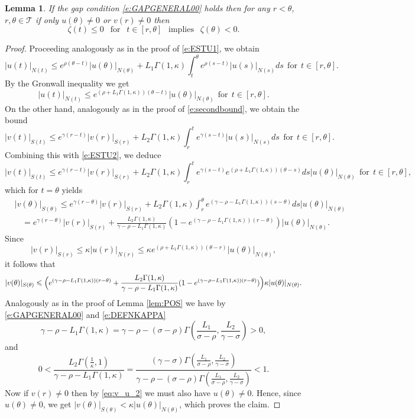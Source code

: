 \documentclass[a4paper,11pt,reqno]{amsart}
\theoremstyle{plain}
\newtheorem{lem}{Lemma}[section]
\theoremstyle{definition}
\numberwithin{equation}{section}
\newcommand{\calt}{\mathcal T}
\renewcommand{\leq}{\leqslant}
\begin{document}
\begin{lem}\label{lem:NEG}
If the gap condition \eqref{e:GAPGENERAL00} holds then for any $r<\theta$, $r,\theta\in\calt$ if only $u(\theta)\neq 0$ or $v(r)\neq 0$ then
$$\zeta(t) \leq 0 \ \ \text{ for }\ \ t\in [r,\theta]\ \ \text{ implies }\ \ \zeta(\theta)<0.$$ 
\end{lem}

\begin{proof}
Proceeding analogously as in the proof of \eqref{e:ESTU1}, we obtain
$$|u(t)|_{N(t)}\leq e^{\rho(\theta-t)}|u(\theta)|_{N(\theta)}+L_1\Gamma(1,\kappa)\int_{t}^{\theta}e^{\rho(s-t)}|u(s)|_{N(s)}ds\ \ \text{for}\ \ t\in [r,\theta].$$
By the Gronwall inequality we get
\begin{equation}\label{e:ESTU2}
|u(t)|_{N(t)}\leq e^{(\rho+L_1\Gamma(1,\kappa))(\theta-t)}|u(\theta)|_{N(\theta)}\ \ \text{for}\ \ t\in [r,\theta].
\end{equation} 
On the other hand, analogously as in the proof of \eqref{e:secondbound}, we obtain the bound
$$|v(t)|_{S(t)}\leq e^{\gamma(r-t)}|v(r)|_{S(r)}+L_2\Gamma(1,\kappa)\int_{r}^{t}e^{\gamma(s-t)}|u(s)|_{N(s)}ds\ \ \text{for}\ \ t\in [r,\theta].$$
Combining this with \eqref{e:ESTU2}, we deduce
$$|v(t)|_{S(t)}\leq e^{\gamma(r-t)}|v(r)|_{S(r)}+L_2\Gamma(1,\kappa)\int_{r}^{t}e^{\gamma(s-t)}e^{(\rho+L_1\Gamma(1,\kappa))(\theta-s)}ds|u(\theta)|_{N(\theta)}\ \ \text{for}\ \ t\in [r,\theta],$$
which for $t=\theta$ yields
\begin{align*}
	&|v(\theta)|_{S(\theta)}\leq e^{\gamma(r-\theta)}|v(r)|_{S(r)}+L_2\Gamma(1,\kappa)\int_{r}^{\theta}e^{(\gamma-\rho-L_1\Gamma(1,\kappa))(s-\theta)}ds|u(\theta)|_{N(\theta)}\\
&\ \ \ \ =e^{\gamma(r-\theta)}|v(r)|_{S(r)}+\frac{L_2\Gamma(1,\kappa)}{\gamma-\rho-L_1\Gamma(1,\kappa)}\left(1-e^{(\gamma-\rho-L_1\Gamma(1,\kappa))(r-\theta)}\right)|u(\theta)|_{N(\theta)}.
\end{align*}
Since
\begin{equation}\label{eq:v_u_2}
|v(r)|_{S(r)}\leq\kappa |u(r)|_{N(r)}\leq \kappa e^{(\rho+L_1\Gamma(1,\kappa))(\theta-r)}|u(\theta)|_{N(\theta)},    
\end{equation}
it follows that
$$|v(\theta)|_{S(\theta)}\leq\Bigl( e^{(\gamma-\rho-L_1\Gamma(1,\kappa))(r-\theta)}+\frac{L_2\Gamma(1,\kappa)}{\gamma-\rho-L_1\Gamma(1,\kappa)}(1-e^{(\gamma-\rho-L_1\Gamma(1,\kappa))(r-\theta)})\Bigr)\kappa|u(\theta)|_{N(\theta)}.$$
Analogously as in the proof of Lemma \ref{lem:POS} we have by \eqref{e:GAPGENERAL00} and \eqref{e:DEFNKAPPA}
$$
\gamma-\rho - L_1\Gamma(1,\kappa) = \gamma-\rho-(\sigma-\rho)\Gamma\left(\frac{L_1}{\sigma-\rho},\frac{L_2}{\gamma-\sigma}\right) > 0,
$$
and
$$
0< \frac{L_2\Gamma(\frac{1}{\kappa},1)}{\gamma-\rho-L_1\Gamma(1,\kappa)}  = \frac{(\gamma-\sigma)\Gamma\left(\frac{L_1}{\sigma-\rho},\frac{L_2}{\gamma-\sigma}\right)}{\gamma-\rho-(\sigma-\rho)\Gamma\left(\frac{L_1}{\sigma-\rho},\frac{L_2}{\gamma-\sigma}\right)} < 1.
$$
Now if $v(r)\neq 0$ then by \eqref{eq:v_u_2} we must also have $u(\theta)\neq0$.
Hence, since $u(\theta)\neq 0$, we get $|v(\theta)|_{S(\theta)}<\kappa |u(\theta)|_{N(\theta)}$, which proves the claim. 
\end{proof}
\end{document}
